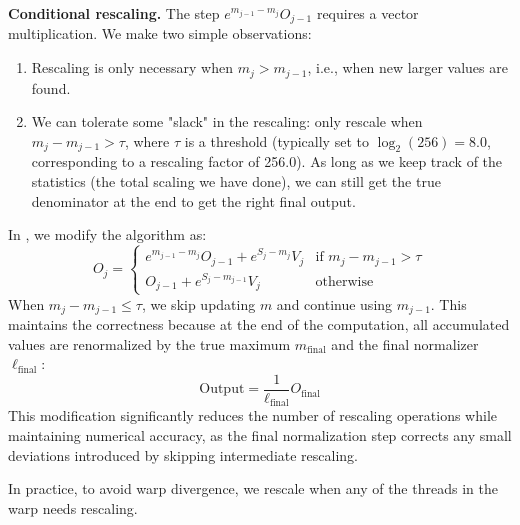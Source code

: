 \textbf{Conditional rescaling.}
The step $e^{m_{j-1} - m_j} O_{j-1}$ requires a vector multiplication. We make two simple observations:
\begin{enumerate}
\item Rescaling is only necessary when $m_j > m_{j-1}$, i.e., when new larger values are found.
\item We can tolerate some "slack" in the rescaling: only rescale when $m_j - m_{j-1} > \tau$, where $\tau$ is a threshold (typically set to $\log_2(256) = 8.0$, corresponding to a rescaling factor of 256.0). As long as we keep track of the statistics (the total scaling we have done), we can still get the true denominator at the end to get the right final output. 
\end{enumerate}

In \faf, we modify the algorithm as:
\begin{equation}
O_j = \begin{cases}
e^{m_{j-1} - m_j} O_{j-1} + e^{S_j - m_j} V_j & \text{if } m_j - m_{j-1} > \tau \\
O_{j-1} + e^{S_j - m_{j-1}} V_j & \text{otherwise}
\end{cases}
\end{equation}
When $m_j - m_{j-1} \leq \tau$, we skip updating $m$ and continue using $m_{j-1}$. This maintains the correctness because at the end of the computation, all accumulated values are renormalized by the true maximum $m_{\text{final}}$ and the final normalizer $\ell_{\text{final}}$:
{\setlength{\abovedisplayskip}{0.1pt}%
 \setlength{\belowdisplayskip}{1pt}%
 \setlength{\abovedisplayshortskip}{0.1pt}%
 \setlength{\belowdisplayshortskip}{1pt}%
\begin{equation*}
\text{Output} = \frac{1}{\ell_{\text{final}}} O_{\text{final}}
\end{equation*}}
This modification significantly reduces the number of rescaling operations while maintaining numerical accuracy, as the final normalization step corrects any small deviations introduced by skipping intermediate rescaling.

In practice, to avoid warp divergence, we rescale when any of the threads in the warp needs rescaling.

